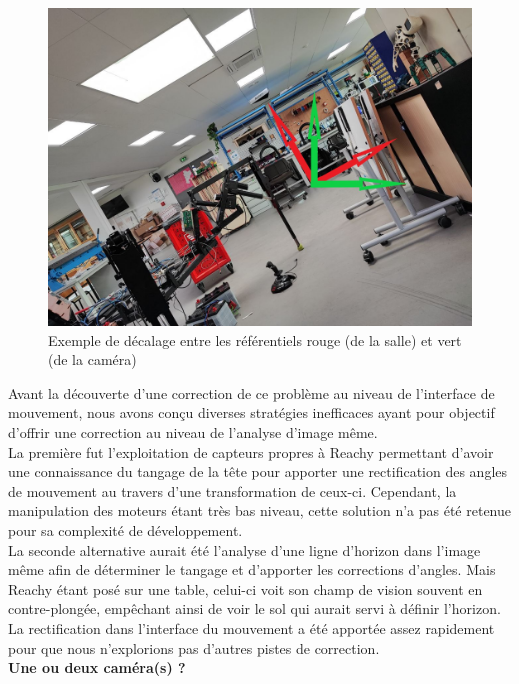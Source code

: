 \documentclass[a4paper,french]{article}
\begin{document}
\begin{figure}[H]
    \centering
    \includegraphics[scale=0.27]{figures/tangage.jpg}
    \caption{Exemple de décalage entre les référentiels rouge (de la salle) et vert (de la caméra)}
    \label{fig:Tangage}
\end{figure}

Avant la découverte d'une correction de ce problème au niveau de l'interface de mouvement, nous avons conçu diverses stratégies inefficaces ayant pour objectif d'offrir une correction au niveau de l'analyse d'image même.\\
La première fut l'exploitation de capteurs propres à Reachy permettant d'avoir une connaissance du tangage de la tête pour apporter une rectification des angles de mouvement au travers d'une transformation de ceux-ci. Cependant, la manipulation des moteurs étant très bas niveau, cette solution n'a pas été retenue pour sa complexité de développement.\\
La seconde alternative aurait été l'analyse d'une ligne d'horizon dans l'image même afin de déterminer le tangage et d'apporter les corrections d'angles. Mais Reachy étant posé sur une table, celui-ci voit son champ de vision souvent en contre-plongée, empêchant ainsi de voir le sol qui aurait servi à définir l'horizon. La rectification dans l'interface du mouvement a été apportée assez rapidement pour que nous n'explorions pas d'autres pistes de correction.\\

\textbf{Une ou deux caméra(s) ?}\\
\end{document}
